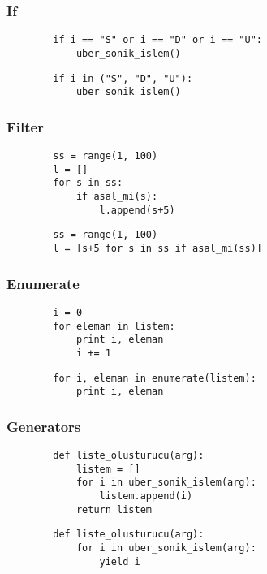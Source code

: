\documentclass[10pt, compress]{beamer}
\begin{document}
\begin{frame}[fragile]
\frametitle{If}    
    \begin{verbatim}
        if i == "S" or i == "D" or i == "U":
            uber_sonik_islem()
    \end{verbatim}
    
    \begin{verbatim}
        if i in ("S", "D", "U"):
            uber_sonik_islem()
    \end{verbatim} 
\end{frame}

\begin{frame}[fragile]
\frametitle{Filter}    
    \begin{verbatim}
        ss = range(1, 100)
        l = []
        for s in ss:
            if asal_mi(s):
                l.append(s+5)
    \end{verbatim}
    
    \begin{verbatim}
        ss = range(1, 100)
        l = [s+5 for s in ss if asal_mi(ss)]
    \end{verbatim} 
\end{frame}

\begin{frame}[fragile]
\frametitle{Enumerate}    
    \begin{verbatim}
        i = 0
        for eleman in listem:
            print i, eleman
            i += 1
    \end{verbatim}
    
    \begin{verbatim}
        for i, eleman in enumerate(listem):
            print i, eleman
    \end{verbatim} 
\end{frame}

\begin{frame}[fragile]
\frametitle{Generators}    
    \begin{verbatim}
        def liste_olusturucu(arg):
            listem = []
            for i in uber_sonik_islem(arg):
                listem.append(i)
            return listem
    \end{verbatim}
    
    \begin{verbatim}
        def liste_olusturucu(arg):
            for i in uber_sonik_islem(arg):
                yield i
    \end{verbatim} 
\end{frame}
\end{document}
